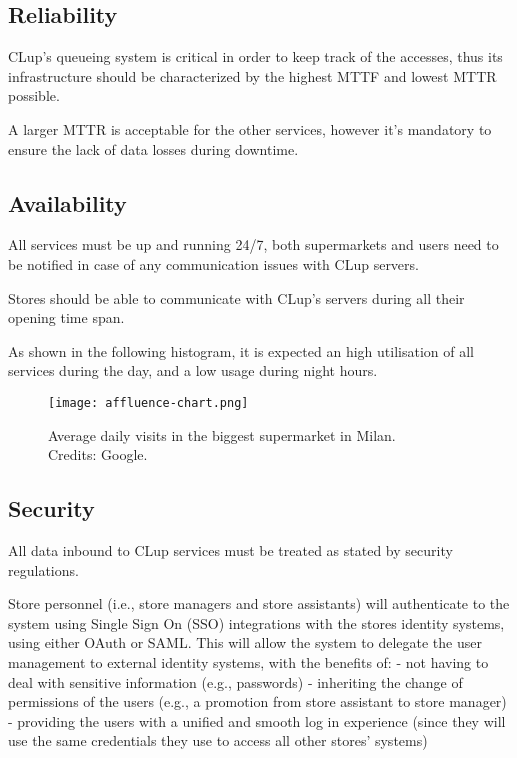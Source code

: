 \documentclass[../../main.tex]{subfiles}
\begin{document}
	\subsection{Reliability}

	CLup's queueing system is critical in order to keep track of the accesses, thus its infrastructure 
	should be characterized by the highest MTTF and lowest MTTR possible.

	A larger MTTR is acceptable for the other services, however it's mandatory to ensure the lack of 
	data losses during downtime.

	\subsection{Availability}

	All services must be up and running 24/7, both supermarkets and users need to be notified in case of 
	any communication issues with CLup servers.

	Stores should be able to communicate with CLup's servers during all their opening time span.

	As shown in the following histogram, it is expected an high utilisation of all services during the day, 
	and a low usage during night hours.

	\begin{figure}[h!]
	    \centering
	    \texttt{[image: affluence-chart.png]}
	    \caption{Average daily visits in the biggest supermarket in Milan. \\Credits: Google.}
  	\end{figure}

	\subsection{Security}

	All data inbound to CLup services must be treated as stated by security regulations. 

	Store personnel (i.e., store managers and store assistants) will authenticate to the system using Single Sign On (SSO) integrations with the stores identity systems, using either OAuth or SAML. This will allow the system to delegate the user management to external identity systems, with the benefits of:
	- not having to deal with sensitive information (e.g., passwords)
	- inheriting the change of permissions of the users (e.g., a promotion from store assistant to store manager)
	- providing the users with a unified and smooth log in experience (since they will use the same credentials they use to access all other stores' systems)
\end{document}
